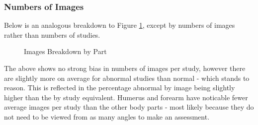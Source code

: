 \documentclass[11pt]{article} %
\theoremstyle{plain}
\theoremstyle{definition}
\begin{document}
\subsubsection{Numbers of Images}
Below is an analogous breakdown to Figure \ref{fig:ImagesByPart_Breakdown}, except by numbers of images rather than numbers of studies.
\begin{figure}[!ht]
\centering
{}
\newline
{}
\caption{Images Breakdown by Part}
\label{fig:ImagesByPart_Breakdown}
\end{figure}
\FloatBarrier
\noindent
The above shows no strong bias in numbers of images per study, however there are slightly more on average for abnormal studies than normal - which stands to reason. This is reflected in the percentage abnormal by image being slightly higher than the by study equivalent. Humerus and forearm have noticable fewer average images per study than the other body parts - most likely because they do not need to be viewed from as many angles to make an assessment.
\end{document}
